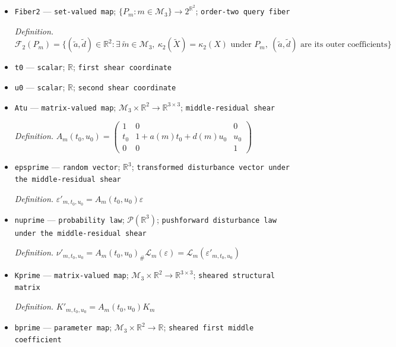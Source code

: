 \documentclass{article}
\begin{document}
\begin{itemize}
  \par\smallskip\noindent\emph{Definition.} \(\mathcal M_{2,\mathrm{reg}}\) is the class in Definition \(\mathrm{def:covariance-regular-class}\)
  \item \texttt{Fiber2} --- \texttt{set-\allowbreak{}valued map}; \(\{P_m:m\in\mathcal M_3\}\to2^{\mathbb R^2}\); \texttt{order-\allowbreak{}two query fiber}
  \par\smallskip\noindent\emph{Definition.} \(\mathcal F_2(P_m)=\{(\widetilde a,\widetilde d)\in\mathbb R^2:\exists\,\widetilde m\in\mathcal M_3,\ \kappa_2(\widetilde X)=\kappa_2(X)\text{ under }P_m,\ (\widetilde a,\widetilde d)\text{ are its outer coefficients}\}\)
  \item \texttt{t0} --- \texttt{scalar}; \(\mathbb R\); \texttt{first shear coordinate}
  \item \texttt{u0} --- \texttt{scalar}; \(\mathbb R\); \texttt{second shear coordinate}
  \item \texttt{Atu} --- \texttt{matrix-\allowbreak{}valued map}; \(\mathcal M_3\times\mathbb R^2\to\mathbb R^{3\times3}\); \texttt{middle-\allowbreak{}residual shear}
  \par\smallskip\noindent\emph{Definition.} \(A_m(t_0,u_0)=\begin{pmatrix}1&0&0\\t_0&1+a(m)t_0+d(m)u_0&u_0\\0&0&1\end{pmatrix}\)
  \item \texttt{epsprime} --- \texttt{random vector}; \(\mathbb R^3\); \texttt{transformed disturbance vector under the middle-\allowbreak{}residual shear}
  \par\smallskip\noindent\emph{Definition.} \(\varepsilon'_{m,t_0,u_0}=A_m(t_0,u_0)\varepsilon\)
  \item \texttt{nuprime} --- \texttt{probability law}; \(\mathcal P(\mathbb R^3)\); \texttt{pushforward disturbance law under the middle-\allowbreak{}residual shear}
  \par\smallskip\noindent\emph{Definition.} \(\nu'_{m,t_0,u_0}=A_m(t_0,u_0)_{\#}\mathcal L_m(\varepsilon)=\mathcal L_m(\varepsilon'_{m,t_0,u_0})\)
  \item \texttt{Kprime} --- \texttt{matrix-\allowbreak{}valued map}; \(\mathcal M_3\times\mathbb R^2\to\mathbb R^{3\times3}\); \texttt{sheared structural matrix}
  \par\smallskip\noindent\emph{Definition.} \(K'_{m,t_0,u_0}=A_m(t_0,u_0)K_m\)
  \item \texttt{bprime} --- \texttt{parameter map}; \(\mathcal M_3\times\mathbb R^2\to\mathbb R\); \texttt{sheared first middle coefficient}

\end{itemize}
\end{document}
